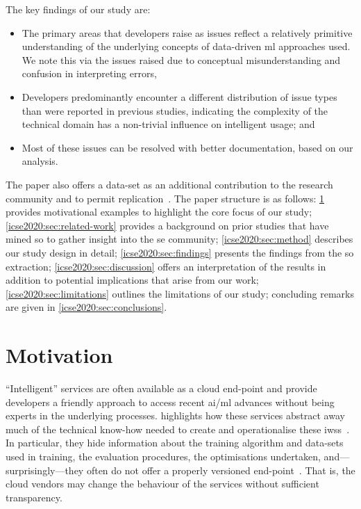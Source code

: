The key findings of our study are:
\begin{itemize}
\item The primary areas that developers raise as issues reflect a relatively primitive understanding of the underlying concepts of data-driven \gls{ml} approaches used. We note this via the issues raised due to conceptual misunderstanding and confusion in interpreting errors,
\item Developers predominantly encounter a different distribution of issue types than were reported in previous studies, indicating the complexity of the technical domain has a non-trivial influence on intelligent  usage; and
\item Most of these issues can be resolved with better documentation, based on our analysis.
\end{itemize}

The paper also offers a data-set as an additional contribution to the research community and to permit replication~. The paper structure is as follows: \cref{icse2020:sec:motivation} provides motivational examples to highlight the core focus of our study; \cref{icse2020:sec:related-work} provides a background on prior studies that have mined \gls{so} to gather insight into the \gls{se} community; \cref{icse2020:sec:method} describes our study design in detail; \cref{icse2020:sec:findings} presents the findings from the \gls{so} extraction; \cref{icse2020:sec:discussion} offers an interpretation of the results in addition to potential implications that arise from our work; \cref{icse2020:sec:limitations} outlines the limitations of our study; concluding remarks are given in \cref{icse2020:sec:conclusions}.

\section{Motivation}
\label{icse2020:sec:motivation}

``Intelligent'' services are often available as a cloud end-point and provide developers a friendly approach to access recent \gls{ai}/\gls{ml} advances without being experts in the underlying processes.  highlights how these services abstract away much of the technical know-how needed to create and operationalise these \glspl{iws}~\citep{Ortiz:2017wg}. In particular, they hide information about the training algorithm and data-sets used in training, the evaluation procedures, the optimisations undertaken, and---surprisingly---they often do not offer a properly versioned end-point~\citep{Cummaudo:2019icsme, Ohtake:2019vi}. That is, the cloud vendors may change the behaviour of the services without sufficient transparency.

